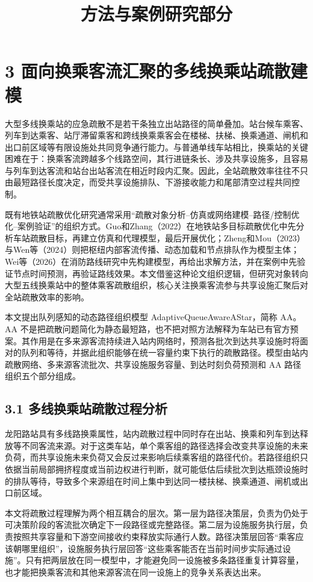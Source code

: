 \documentclass[UTF8,a4paper,12pt]{ctexart}
\title{方法与案例研究部分}
\author{}
\date{}
\begin{document}
\maketitle

\section{3 面向换乘客流汇聚的多线换乘站疏散建模}

大型多线换乘站的应急疏散不是若干条独立出站路径的简单叠加。站台候车乘客、列车到达乘客、站厅滞留乘客和跨线换乘乘客会在楼梯、扶梯、换乘通道、闸机和出口前区域等有限设施处共同竞争通行能力。与普通单线车站相比，换乘站的关键困难在于：换乘客流跨越多个线路空间，其行进链条长、涉及共享设施多，且容易与列车到达客流和站台出站客流在相近时段内汇聚。因此，全站疏散效率往往不只由最短路径长度决定，而受共享设施排队、下游接收能力和尾部清空过程共同控制。

既有地铁站疏散优化研究通常采用“疏散对象分析--仿真或网络建模--路径/控制优化--案例验证”的组织方式。Guo和Zhang（2022）在地铁站多目标疏散优化中先分析车站疏散目标，再建立仿真和代理模型，最后开展优化；Zheng和Mou（2023）与Wen等（2024）则把枢纽内部客流传播、动态加载和节点排队作为模型主体；Wei等（2026）在消防路线研究中先构建模型，再给出求解方法，并在案例中先验证节点时间预测，再验证路线效果。本文借鉴这种论文组织逻辑，但研究对象转向大型五线换乘站中的整体乘客疏散组织，核心关注换乘客流参与共享设施汇聚后对全站疏散效率的影响。

本文提出队列感知的动态路径组织模型 AdaptiveQueueAwareAStar，简称 AA。AA 不是把疏散问题简化为静态最短路，也不把对照方法解释为车站已有官方预案。其作用是在多来源客流持续进入站内网络时，预测各批次到达共享设施时将面对的队列和等待，并据此组织能够在统一容量约束下执行的疏散路径。模型由站内疏散网络、多来源客流批次、共享设施服务容量、到达时刻负荷预测和 AA 路径组织五个部分组成。

\subsection{3.1 多线换乘站疏散过程分析}

龙阳路站具有多线路换乘属性，站内疏散过程中同时存在出站、换乘和列车到达释放等不同客流来源。对于这类车站，单个乘客组的路径选择会改变共享设施的未来负荷，而共享设施未来负荷又会反过来影响后续乘客组的路径代价。若路径组织只依据当前局部拥挤程度或当前边权进行判断，就可能低估后续批次到达瓶颈设施时的排队等待，导致多个来源组在时间上集中到达同一楼扶梯、换乘通道、闸机或出口前区域。

本文将疏散过程理解为两个相互耦合的层次。第一层为路径决策层，负责为仍处于可决策阶段的客流批次确定下一段路径或完整路径。第二层为设施服务执行层，负责按照共享容量和下游空间接收约束释放实际通行人数。路径决策层回答“乘客应该朝哪里组织”，设施服务执行层回答“这些乘客能否在当前时间步实际通过设施”。只有把两层放在同一模型中，才能避免同一设施被多条路径重复计算容量，也才能把换乘客流和其他来源客流在同一设施上的竞争关系表达出来。
\end{document}
